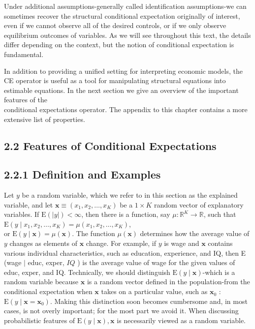 \documentclass[10pt]{article}
\begin{document}
Under additional assumptions-generally called identification assumptions-we can sometimes recover the structural conditional expectation originally of interest, even if we cannot observe all of the desired controls, or if we only observe equilibrium outcomes of variables. As we will see throughout this text, the details differ depending on the context, but the notion of conditional expectation is fundamental.

In addition to providing a unified setting for interpreting economic models, the CE operator is useful as a tool for manipulating structural equations into estimable equations. In the next section we give an overview of the important features of the\\
conditional expectations operator. The appendix to this chapter contains a more extensive list of properties.

\subsection*{2.2 Features of Conditional Expectations}
\subsection*{2.2.1 Definition and Examples}
Let $y$ be a random variable, which we refer to in this section as the explained variable, and let $\mathbf{x} \equiv\left(x_{1}, x_{2}, \ldots, x_{K}\right)$ be a $1 \times K$ random vector of explanatory variables. If $\mathrm{E}(|y|)<\infty$, then there is a function, say $\mu: \mathbb{R}^{K} \rightarrow \mathbb{R}$, such that\\
$\mathrm{E}\left(y \mid x_{1}, x_{2}, \ldots, x_{K}\right)=\mu\left(x_{1}, x_{2}, \ldots, x_{K}\right)$,\\
or $\mathrm{E}(y \mid \mathbf{x})=\mu(\mathbf{x})$. The function $\mu(\mathbf{x})$ determines how the average value of $y$ changes as elements of $\mathbf{x}$ change. For example, if $y$ is wage and $\mathbf{x}$ contains various individual characteristics, such as education, experience, and IQ, then E (wage $\mid$ educ, exper, $I Q$ ) is the average value of wage for the given values of educ, exper, and IQ. Technically, we should distinguish $\mathrm{E}(y \mid \mathbf{x})$-which is a random variable because $\mathbf{x}$ is a random vector defined in the population-from the conditional expectation when $\mathbf{x}$ takes on a particular value, such as $\mathbf{x}_{0}$ : $\mathrm{E}\left(y \mid \mathbf{x}=\mathbf{x}_{0}\right)$. Making this distinction soon becomes cumbersome and, in most cases, is not overly important; for the most part we avoid it. When discussing probabilistic features of $\mathrm{E}(y \mid \mathbf{x}), \mathbf{x}$ is necessarily viewed as a random variable.
\end{document}
